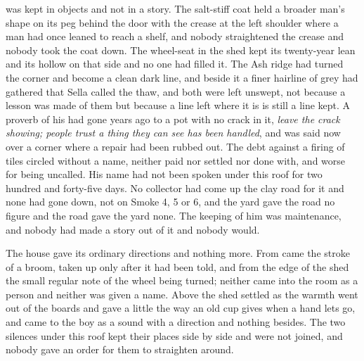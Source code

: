  was kept in objects and not in a story. The salt-stiff coat held a broader man's shape on its peg behind the door with the crease at the left shoulder where a man had once leaned to reach a shelf, and nobody straightened the crease and nobody took the coat down. The wheel-seat in the shed kept its twenty-year lean and its hollow on that side and no one had filled it. The Ash ridge had turned the corner and become a clean dark line, and beside it a finer hairline of grey had gathered that Sella called the thaw, and both were left unswept, not because a lesson was made of them but because a line left where it is is still a line kept. A proverb of his had gone years ago to a pot with no crack in it, \emph{leave the crack showing; people trust a thing they can see has been handled}, and was said now over a corner where a repair had been rubbed out. The debt against a firing of tiles circled without a name, neither paid nor settled nor done with, and worse for being uncalled. His name had not been spoken under this roof for two hundred and forty-five days. No collector had come up the clay road for it and none had gone down, not on Smoke 4, 5 or 6, and the yard gave the road no figure and the road gave the yard none. The keeping of him was maintenance, and nobody had made a story out of it and nobody would.

The house gave its ordinary directions and nothing more. From  came the stroke of a broom, taken up only after it had been told, and from the edge of the shed the small regular note of the wheel being turned; neither came into the room as a person and neither was given a name. Above the shed  settled as the warmth went out of the boards and gave a little the way an old cup gives when a hand lets go, and came to the boy as a sound with a direction and nothing besides. The two silences under this roof kept their places side by side and were not joined, and nobody gave an order for them to straighten around.

